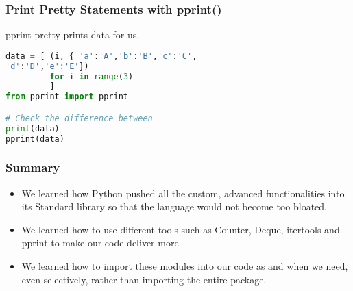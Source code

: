 \documentclass{beamer}
\begin{document}
\begin{frame}[fragile]
\frametitle{Print Pretty Statements with pprint()}
pprint pretty prints data for us.
\begin{lstlisting}[language=Python]
data = [ (i, { 'a':'A','b':'B','c':'C',
'd':'D','e':'E'})
         for i in range(3)
         ]
from pprint import pprint

# Check the difference between 
print(data)
pprint(data)
\end{lstlisting}
\end{frame}

\begin{frame}
\frametitle{Summary}
\begin{itemize}
\item We learned how Python pushed all the custom, advanced functionalities into its Standard library so that the language would not become too bloated.
\item We learned how to use different tools such as Counter, Deque, itertools and pprint to make our code deliver more.
\item We learned how to import these modules into our code as and when we need, even selectively, rather than importing the entire package.
\end{itemize}
\end{frame}
\end{document}
